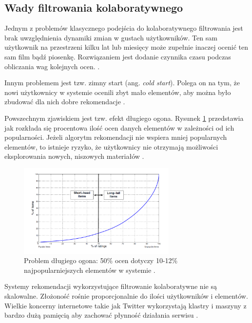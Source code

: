 \documentclass[twoside]{iisthesis}
\begin{document}
	 
	 \subsection{Wady filtrowania kolaboratywnego}
	 
	 Jednym z problemów klasycznego podejścia do kolaboratywnego filtrowania jest brak uwzględnienia dynamiki zmian w gustach użytkowników. Ten sam użytkownik na przestrzeni kilku lat lub miesięcy może zupełnie inaczej ocenić ten sam film bądź piosenkę. Rozwiązaniem jest dodanie czynnika czasu podczas obliczania wag kolejnych ocen. \cite{id:NewRecommentationAlgoritmBasedOnSocialNetwork,id:NextSongRecommendationWithTemporalDynamics,koren2009matrix}.
	 
	 Innym problemem jest tzw. zimny start (ang. \textit{cold start}). Polega on na tym, że nowi użytkownicy w systemie ocenili zbyt mało elementów, aby można było zbudować dla nich dobre rekomendacje \cite{id:RubensRecSysHB2010,id:zhang2015hybrid}.
	 
	 Powszechnym zjawiskiem jest tzw. efekt długiego ogona. Rysunek \ref{fig:longtail} przedstawia jak rozkłada się procentowa ilość ocen danych elementów w zależności od ich popularności. Jeżeli algorytm rekomendacji nie wspiera mniej popularnych elementów, to istnieje ryzyko, że użytkownicy nie otrzymają możliwości eksplorowania nowych, niszowych materiałów \cite{id:celma2010music,id:RubensRecSysHB2010}.
	 
  \begin{figure}[!ht] 
 	  	\centering
 	  	\includegraphics[width=0.7\textwidth]{longtail}
 	  	\caption{Problem długiego ogona: 50\% ocen dotyczy 10-12\% najpopularniejszych elementów w systemie \protect\cite{id:RubensRecSysHB2010}.}
 	  	\label{fig:longtail}
  \end{figure}
	 
	 Systemy rekomendacji wykorzystujące filtrowanie kolaboratywne nie są skalowalne. Złożoność rośnie proporcjonalnie do ilości użytkowników i elementów. Wielkie koncerny internetowe takie jak Twitter wykorzystają klastry i maszyny z bardzo dużą pamięcią aby zachować płynność działania serwisu \cite{id:gupta2013wtf}.
	 
\end{document}

